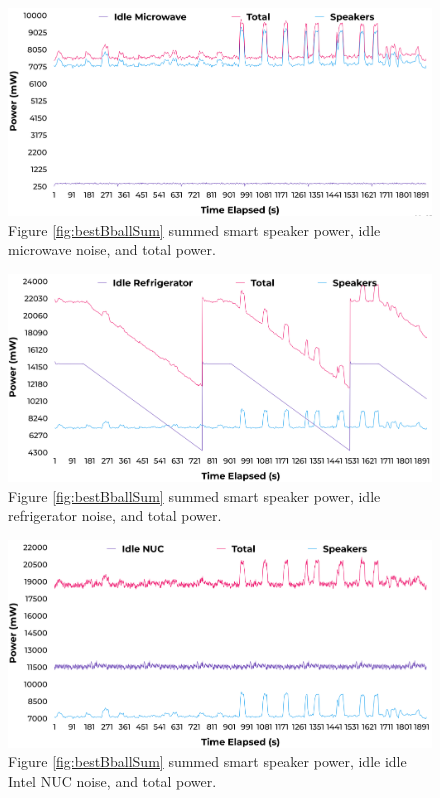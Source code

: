 \begin{figure}[H]
  \centering
  \includegraphics[width=1\textwidth]{figures/idleuWaveNoise.png}
  \caption{Figure \ref{fig:bestBballSum} summed smart speaker power, idle microwave noise, and total power.}
  \label{fig:uWaveIdle}
\end{figure}

\begin{figure}[H]
  \centering
  \includegraphics[width=1\textwidth]{figures/idleFridgeNoise.png}
  \caption{Figure \ref{fig:bestBballSum} summed smart speaker power, idle refrigerator noise, and total power.}
  \label{fig:fridgeIdle}
\end{figure}

\begin{figure}[H]
  \centering
  \includegraphics[width=1\textwidth]{figures/idleIntelNUCNoise.png}
  \caption{Figure \ref{fig:bestBballSum} summed smart speaker power, idle idle Intel NUC noise, and total power.}
  \label{fig:nucIdle}
\end{figure}


